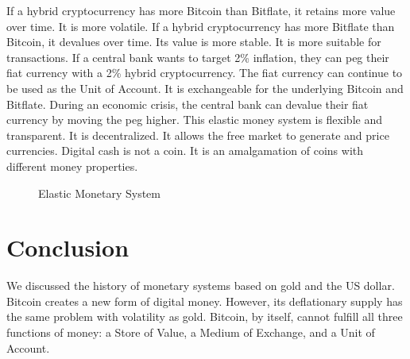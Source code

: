 \documentclass{article}      %
\begin{document}
If a hybrid cryptocurrency has more Bitcoin than Bitflate, it retains more value over time. It is more volatile. If a hybrid cryptocurrency has more Bitflate than Bitcoin, it devalues over time. Its value is more stable. It is more suitable for transactions. If a central bank wants to target 2\% inflation, they can peg their fiat currency with a 2\% hybrid cryptocurrency. The fiat currency can continue to be used as the Unit of Account. It is exchangeable for the underlying Bitcoin and Bitflate. During an economic crisis, the central bank can devalue their fiat currency by moving the peg higher. This elastic money system is flexible and transparent. It is decentralized. It allows the free market to generate and price currencies. Digital cash is not a coin. It is an amalgamation of coins with different money properties.

\begin{figure}[h]
\centering
{}
\caption{Elastic Monetary System}
\end{figure}

\section{Conclusion}

We discussed the history of monetary systems based on gold and the US dollar. Bitcoin creates a new form of digital money. However, its deflationary supply has the same problem with volatility as gold. Bitcoin, by itself, cannot fulfill all three functions of money: a Store of Value, a Medium of Exchange, and a Unit of Account.
\end{document}
